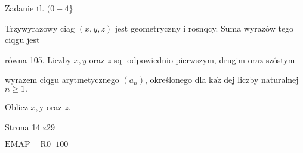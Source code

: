 \documentclass[a4paper,12pt]{article}
\begin{document}
Zadanie tl. $(0-4$\}

Trzywyrazowy ciag $(x,y,z)$ jest geometryczny i rosnqcy. Suma wyrazów tego ciqgu jest

równa 105. Liczby $x, y$ oraz $z$ sq- odpowiednio-pierwszym, drugim oraz szóstym

wyrazem ciqgu arytmetycznego $(a_{n})$, określonego dla $\mathrm{k}\mathrm{a}\dot{\mathrm{z}}$ dej liczby naturalnej $n\geq 1.$

Oblicz $x, \mathrm{y}$ oraz $z.$

Strona 14 z29

$\mathrm{E}\mathrm{M}\mathrm{A}\mathrm{P}-\mathrm{R}0_{-}100$
\end{document}
